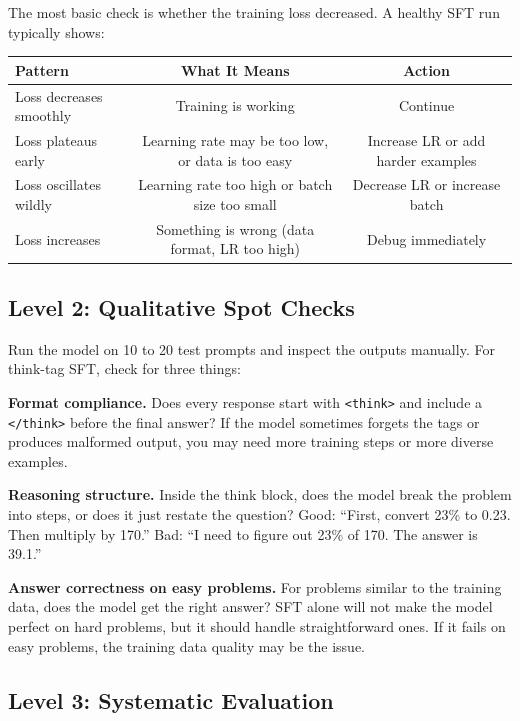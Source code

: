 \begin{chapterenv}
The most basic check is whether the training loss decreased. A healthy SFT run typically shows:

\begin{center}
\begin{tabular}{lcc}
\toprule
\textbf{Pattern} & \textbf{What It Means} & \textbf{Action} \\
\midrule
Loss decreases smoothly & Training is working & Continue \\
Loss plateaus early & Learning rate may be too low, or data is too easy & Increase LR or add harder examples \\
Loss oscillates wildly & Learning rate too high or batch size too small & Decrease LR or increase batch \\
Loss increases & Something is wrong (data format, LR too high) & Debug immediately \\
\bottomrule
\end{tabular}
\end{center}

\subsection{Level 2: Qualitative Spot Checks}

Run the model on 10 to 20 test prompts and inspect the outputs manually. For think-tag SFT, check for three things:

\textbf{Format compliance.} Does every response start with \texttt{<think>} and include a \texttt{</think>} before the final answer? If the model sometimes forgets the tags or produces malformed output, you may need more training steps or more diverse examples.

\textbf{Reasoning structure.} Inside the think block, does the model break the problem into steps, or does it just restate the question? Good: ``First, convert 23\% to 0.23. Then multiply by 170.'' Bad: ``I need to figure out 23\% of 170. The answer is 39.1.''

\textbf{Answer correctness on easy problems.} For problems similar to the training data, does the model get the right answer? SFT alone will not make the model perfect on hard problems, but it should handle straightforward ones. If it fails on easy problems, the training data quality may be the issue.

\subsection{Level 3: Systematic Evaluation}


\end{chapterenv}
